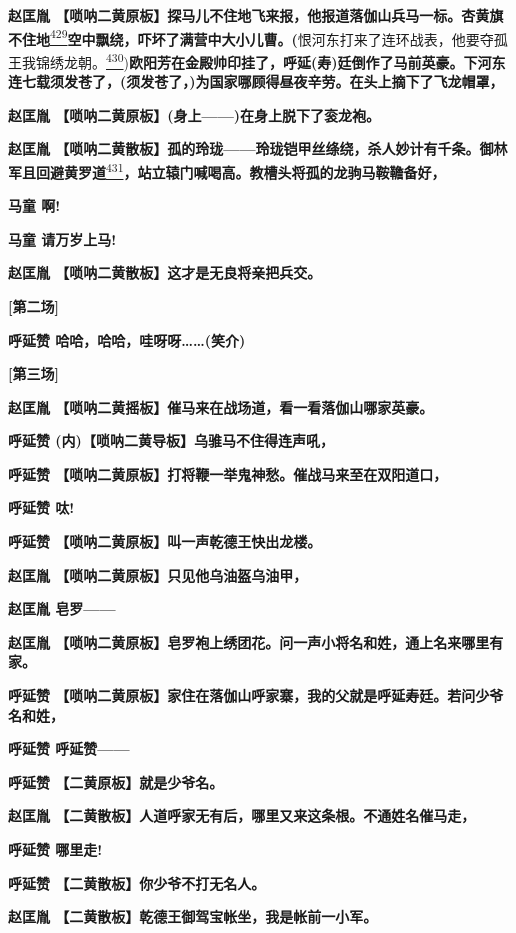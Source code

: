 \textbf{赵匡胤
【唢呐二黄原板】探马儿不住地飞来报，他报道落伽山兵马一标。杏黄旗不住地}\protect\hyperlink{fn429}{\textsuperscript{429}}\textbf{空中飘绕，吓坏了满营中大小儿曹。(}恨河东打来了连环战表，他要夺孤王我锦绣龙朝。\protect\hyperlink{fn430}{\textsuperscript{430}})\textbf{欧阳芳在金殿帅印挂了，呼延(寿)廷倒作了马前英豪。下河东连七载须发苍了，(须发苍了，)为国家哪顾得昼夜辛劳。在头上摘下了飞龙帽罩，}

\textbf{赵匡胤 【唢呐二黄原板】(身上------)在身上脱下了衮龙袍。}

\textbf{赵匡胤
【唢呐二黄散板】孤的玲珑------玲珑铠甲丝绦绕，杀人妙计有千条。御林军且回避黄罗道}\protect\hyperlink{fn431}{\textsuperscript{431}}\textbf{，站立辕门喊喝高。教槽头将孤的龙驹马鞍韂备好，}

\textbf{马童 啊!}

\textbf{马童 请万岁上马!}

\textbf{赵匡胤 【唢呐二黄散板】这才是无良将亲把兵交。}

\textbf{{[}第二场{]}}

\textbf{呼延赞 哈哈，哈哈，哇呀呀\ldots{}\ldots{}(笑介)}

\textbf{{[}第三场{]}}

\textbf{赵匡胤 【唢呐二黄摇板】催马来在战场道，看一看落伽山哪家英豪。}

\textbf{呼延赞 (内)【唢呐二黄导板】乌骓马不住得连声吼，}

\textbf{呼延赞 【唢呐二黄原板】打将鞭一举鬼神愁。催战马来至在双阳道口，}

\textbf{呼延赞 呔!}

\textbf{呼延赞 【唢呐二黄原板】叫一声乾德王快出龙楼。}

\textbf{赵匡胤 【唢呐二黄原板】只见他乌油盔乌油甲，}

\textbf{赵匡胤 皂罗------}

\textbf{赵匡胤
【唢呐二黄原板】皂罗袍上绣团花。问一声小将名和姓，通上名来哪里有家。}

\textbf{呼延赞
【唢呐二黄原板】家住在落伽山呼家寨，我的父就是呼延寿廷。若问少爷名和姓，}

\textbf{呼延赞 呼延赞------}

\textbf{呼延赞 【二黄原板】就是少爷名。}

\textbf{赵匡胤
【二黄散板】人道呼家无有后，哪里又来这条根。不通姓名催马走，}

\textbf{呼延赞 哪里走!}

\textbf{呼延赞 【二黄散板】你少爷不打无名人。}

\textbf{赵匡胤 【二黄散板】乾德王御驾宝帐坐，我是帐前一小军。}

